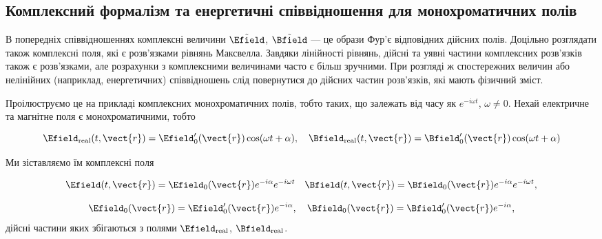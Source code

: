 \subsection*{Комплексний формалізм та енергетичні співвідношення для монохроматичних полів}

В попередніх співвідношеннях комплексні величини \(\tilde{\Efield}\), \(\tilde{\Bfield}\) --- це образи Фур'є
відповідних дійсних полів. Доцільно розглядати також комплексні поля, які є розв'язками рівнянь Максвелла. Завдяки
лінійності рівнянь, дійсні та уявні частини комплексних розв'язків також є розв'язками, але розрахунки з комплексними
величинами часто є більш зручними. При розгляді ж спостережних величин або нелінійних (наприклад, енергетичних)
співвідношень слід повернутися до дійсних частин розв'язків, які мають фізичний зміст.

Проілюструємо це на прикладі комплексних монохроматичних полів, тобто таких, що залежать від часу як \(e^{-i\omega t}\),
\(\omega \neq 0\). Нехай електричне та магнітне поля є монохроматичними, тобто

\begin{equation*}
	\Efield_{\text{real}}(t, \vect{r}) = \Efield'_0(\vect{r}) \cos(\omega t + \alpha), \quad \Bfield_{\text{real}}(t, \vect{r}) = \Bfield'_0(\vect{r})
	\cos(\omega t + \alpha)
	\label{eq:real_fields}
\end{equation*}

Ми зіставляємо їм комплексні поля

\begin{equation*}
	\Efield(t, \vect{r}) = \Efield_0(\vect{r}) e^{-i\alpha} e^{-i\omega t} \quad \Bfield(t, \vect{r}) = \Bfield_0(\vect{r}) e^{-i\alpha}
	e^{-i\omega t},
	\label{eq:complex_fields}
\end{equation*}

\begin{equation*}
	\Efield_0(\vect{r}) = \Efield'_0(\vect{r}) e^{-i\alpha}, \quad \Bfield_0(\vect{r}) = \Bfield'_0(\vect{r}) e^{-i\alpha},
\end{equation*}
дійсні частини яких збігаються з полями \(\Efield_{\text{real}}\), \(\Bfield_{\text{real}}\).

